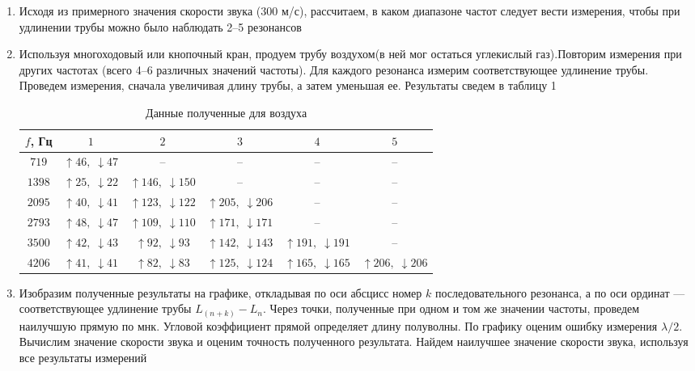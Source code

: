 \documentclass[a4paper,12pt]{article}
\begin{document}
\begin{enumerate}
\begin{enumerate}
\itemsep0em
\item Исходя из примерного значения скорости звука (300 м/с), рассчитаем, в каком диапазоне частот следует вести измерения, чтобы при удлинении трубы можно было наблюдать 2–5 резонансов
\item Используя многоходовый или кнопочный кран, продуем трубу воздухом(в ней мог остаться углекислый газ).Повторим измерения при других частотах (всего 4–6 различных значений частоты). Для каждого резонанса измерим соответствующее удлинение трубы. Проведем измерения, сначала увеличивая длину трубы, а затем уменьшая ее. Результаты сведем в таблицу 1 
\begin{table}[h]
\begin{center}
\begin{tabular}{|c|c|c|c|c|c|}
\hline 
$f$, Гц & $1$ & $2$ & $3$ & $4$ & $5$ \\ 
\hline 
$ 719 $ & $ \uparrow 46 , \; \downarrow 47 $ & -- & -- & -- & -- \\ 
\hline 
$ 1398 $ & $ \uparrow 25 , \; \downarrow 22 $ & $ \uparrow 146 , \; \downarrow 150 $ & -- & -- & -- \\ 
\hline 
$ 2095 $ & $ \uparrow 40 , \; \downarrow 41 $ & $ \uparrow 123 , \; \downarrow 122 $ & $ \uparrow 205 , \; \downarrow 206 $ & -- & -- \\ 
\hline 
$ 2793 $ & $ \uparrow 48 , \; \downarrow 47 $ & $ \uparrow 109 , \; \downarrow 110 $ & $ \uparrow 171 , \; \downarrow 171 $ & -- & -- \\ 
\hline 
$ 3500 $ & $ \uparrow 42 , \; \downarrow 43 $ & $ \uparrow 92 , \; \downarrow 93 $ & $ \uparrow 142 , \; \downarrow 143 $ & $ \uparrow 191 , \; \downarrow 191 $ & -- \\ 
\hline 
$ 4206 $ & $ \uparrow 41 , \; \downarrow 41 $ & $ \uparrow 82 , \; \downarrow 83 $ & $ \uparrow 125 , \; \downarrow 124 $ & $ \uparrow 165 , \; \downarrow 165 $ & $ \uparrow 206 , \; \downarrow 206 $ \\ 
\hline 
\end{tabular} 
\end{center}
\caption{Данные полученные для воздуха}
\label{air}
\end{table}
\item Изобразим полученные результаты на графике, откладывая по оси абсцисс номер
$k$ последовательного резонанса, а по оси ординат — соответствующее удлинение трубы $L_{(n+k)}-L_n$. Через точки, полученные при одном и том же значении частоты, проведем наилучшую прямую по мнк. Угловой коэффициент прямой определяет длину полуволны.
По графику оценим ошибку измерения $\lambda/2$. Вычислим значение
скорости звука
и оценим точность полученного результата. Найдем наилучшее значение скорости звука, используя все результаты измерений


\end{enumerate}
\end{enumerate}
\end{document}
